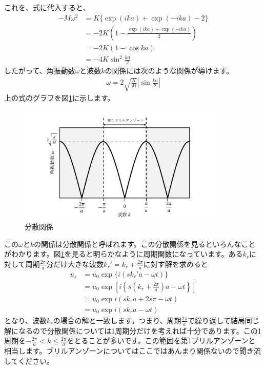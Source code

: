 \documentclass[10pt,b5paper,papersize,dvipdfmx]{jsbook}
\begin{document}
これを、式に代入すると、
\begin{align}
  -M\omega^2 &= K\{\exp(ika) + \exp(-ika) - 2\} \\
             &= -2K\left(1-\frac{\exp(ika) + \exp(-ika)}{2}\right) \\
             &= -2K(1-\cos ka)\\
             &= -4K\sin^2\frac{ka}{2}
\end{align}
したがって、角振動数$\omega$と波数$k$の関係には次のような関係が導けます。
\begin{align}
  \omega = 2 \sqrt{\frac{K}{M}} \left| \sin \frac{ka}{2}\right|
\end{align}
上の式のグラフを図\ref{fig:bunnsan}に示します。
\begin{figure}[htbp]
  \centering
  \includegraphics[width=10cm]{img/bunsann.pdf}  %
  \caption{分散関係}
  \label{fig:bunnsan}
\end{figure}
この$\omega$と$k$の関係は分散関係と呼ばれます。この分散関係を見るといろんなことがわかります。図\ref{fig:bunnsan}を見ると明らかなように周期関数になっています。ある$k_r$に対して周期$\frac{2\pi}{a}$分だけ大きな波数$k_r' = k_r + \frac{2\pi}{a}$に対す解を求めると
\begin{align}
  u_s &= u_0 \exp\{i(sk_r'a - \omega t)\}\\
      &= u_0 \exp \left[i\left\{s \left(k_r + \frac{2\pi}{a}\right)a-\omega t\right\}\right]\\
      & = u_0 \exp {i(sk_ra + 2s\pi - \omega t)}\\
      & = u_0 \exp {i(sk_ra -\omega t)}
\end{align}
となり、波数$k_r$の場合の解と一致します。つまり、周期$\frac{2\pi}{a}$で繰り返して結局同じ解になるので分散関係については1周期分だけを考えれば十分であります。この1周期を$-\frac{2\pi}{a} < k\leq \frac{2\pi}{a}$をとることが多いです。この範囲を第1ブリルアンゾーンと相当します。ブリルアンゾーンについてはここではあんまり関係ないので聞き流してください。\par
\end{document}
